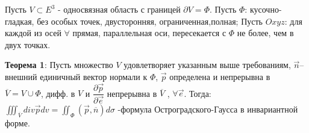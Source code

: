 \par Пусть $V\subset E^{3}$ - односвязная область с границей $\partial V=\Phi $. Пусть $\Phi$: кусочно-гладкая, без особых точек, двусторонняя, ограниченная,полная; Пусть $Oxyz$: для каждой из осей $\forall$ прямая, параллельная оси, пересекается с $\Phi$ не более, чем в двух точках.
\par \textbf{Теорема 1}: Пусть множество $V$ удовлетворяет указанным выше требованиям, $\overrightarrow{n}$– внешний единичный вектор нормали к $\Phi$, $\overrightarrow{p}$ определена и непрерывна в $\overline{V}=V\cup \Phi$, дифф. в $V$ и $\dfrac{\partial \overrightarrow{p}}{\partial \overrightarrow{e}}$ непрерывна в $\overline{V}$ , $\forall \overrightarrow{e}$.
Тогда: $\iiint _{\overline{V}}div\overrightarrow{p}dv=\iint _{\Phi }\left( \overrightarrow{p},\overline{n}\right) d\sigma$ -формула Остроградского-Гаусса в инвариантной форме.


